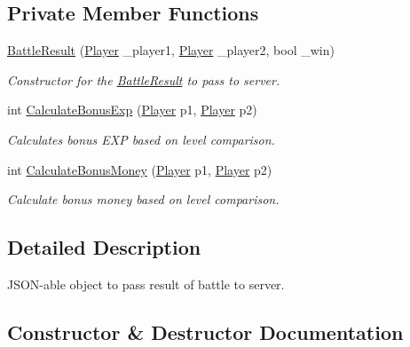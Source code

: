 \subsection*{Private Member Functions}
\begin{DoxyCompactItemize}
\item 
\mbox{\hyperlink{class_battle_result_aa9b8da5a628723badc34d0828591ff0a}{Battle\+Result}} (\mbox{\hyperlink{class_player}{Player}} \+\_\+player1, \mbox{\hyperlink{class_player}{Player}} \+\_\+player2, bool \+\_\+win)
\begin{DoxyCompactList}\small\item\em Constructor for the \mbox{\hyperlink{class_battle_result}{Battle\+Result}} to pass to server. \end{DoxyCompactList}\item 
int \mbox{\hyperlink{class_battle_result_af20191426878f7be611049a4715dcfbd}{Calculate\+Bonus\+Exp}} (\mbox{\hyperlink{class_player}{Player}} p1, \mbox{\hyperlink{class_player}{Player}} p2)
\begin{DoxyCompactList}\small\item\em Calculates bonus E\+XP based on level comparison. \end{DoxyCompactList}\item 
int \mbox{\hyperlink{class_battle_result_ad5eed686021435525855eb55902be318}{Calculate\+Bonus\+Money}} (\mbox{\hyperlink{class_player}{Player}} p1, \mbox{\hyperlink{class_player}{Player}} p2)
\begin{DoxyCompactList}\small\item\em Calculate bonus money based on level comparison. \end{DoxyCompactList}\end{DoxyCompactItemize}


\subsection{Detailed Description}
J\+S\+O\+N-\/able object to pass result of battle to server. 

\subsection{Constructor \& Destructor Documentation}
\mbox{\label{class_battle_result_aa9b8da5a628723badc34d0828591ff0a}} 
